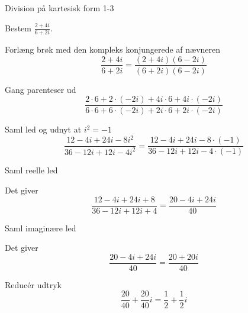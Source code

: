 \documentclass{article}
\begin{document}
\begin{exercise}{Division på kartesisk form 1-3}
	
	Bestem $\frac{2+4i}{6+2i}$.
	
	
	
	\hint 
	
	Forlæng brøk med den kompleks konjungerede af nævneren
	\[
	\frac{2+4i}{6+2i} = \frac{(2+4i)(6-2i)}{(6+2i)(6-2i)} 
	\]
	
	\hint
	
	Gang parenteser ud
	\[
	 \frac{2 \cdot 6 + 2 \cdot (-2i) + 4i \cdot 6 + 4i \cdot (-2i)}{6 \cdot 6 + 6 \cdot (-2i) + 2i \cdot 6 + 2i \cdot (-2i)}
	\]
	
	\hint 
	
	Saml led og udnyt at $i^2 = -1$
	\[
	\frac{12 - 4i + 24i -8i^2}{36 -12i + 12i - 4i^2} = \frac{12 - 4i + 24i -8 \cdot (-1)}{36 -12i + 12i - 4 \cdot (-1)} 
	\]
	
	\hint
	
	Saml reelle led
	
	\hint
	
	Det giver
	\[
	\frac{12 - 4i + 24i +8}{36 -12i + 12i + 4} = \frac{20-4i +24i}{40}
	\]
	
	\hint
	
	Saml imaginære led
	
	
	\hint
	
	Det giver 
	\[
	 \frac{20 -4i +24i}{40}  = \frac{20 + 20i}{40}
	\]
	
	\hint
	
	Reducér udtryk
	\[
	\frac{20}{40} + \frac{20}{40}i  = \frac{1}{2} + \frac{1}{2}i
	\]
	
\end{exercise}

\newpage
\end{document}
